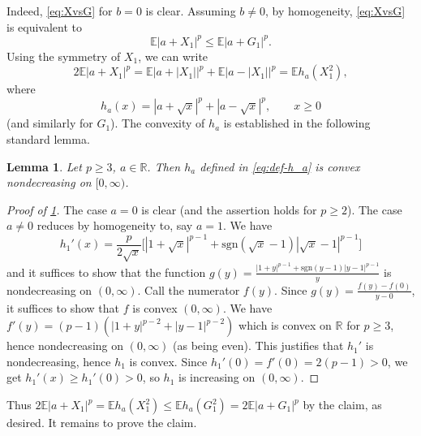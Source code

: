 \documentclass[10pt]{article}
\newcommand{\E}{\mathbb{E}}
\newcommand{\1}{\textbf{1}}
\newcommand{\R}{\mathbb{R}}
\newtheorem{lemma}{Lemma}[subsection]
\theoremstyle{remark}
\theoremstyle{definition}
\begin{document}
\noindent
Indeed, \eqref{eq:XvsG} for $b = 0$ is clear. Assuming $b \neq 0$, by homogeneity, \eqref{eq:XvsG} is equivalent to
\[
\E|a+X_1|^p \leq \E|a+G_1|^p.
\]
Using the symmetry of $X_1$, we can write
\[
2\E|a+X_1|^p = \E|a + |X_1||^p + \E|a-|X_1||^p = \E h_a(X_1^2),
\]
where
\begin{equation}\label{eq:def-h_a}
h_a(x) = |a + \sqrt{x}|^p + |a - \sqrt{x}|^p, \qquad x \geq 0
\end{equation}
(and similarly for $G_1$). The convexity of $h_a$ is established in the following standard lemma.

\begin{lemma}\label{lm:h_a-convex}
Let $p \geq 3$, $a \in \R$. Then $h_a$ defined in \eqref{eq:def-h_a} is convex nondecreasing on $[0,\infty)$.
\end{lemma}
\begin{proof}[Proof of \ref{lm:h_a-convex}]
The case $a = 0$ is clear (and the assertion holds for $p \geq 2$). The case $a \neq 0$ reduces by homogeneity to, say $a = 1$. We have
\[
h_1'(x) = \frac{p}{2\sqrt{x}}\Big[|1+\sqrt{x}|^{p-1}+\text{sgn}(\sqrt{x}-1)|\sqrt{x}-1|^{p-1}\Big]
\]
and it suffices to show that the function $g(y) = \frac{|1+y|^{p-1}+\text{sgn}(y-1)|y-1|^{p-1}}{y}$ is nondecreasing on $(0,\infty)$. Call the numerator $f(y)$. Since $g(y) = \frac{f(y) - f(0)}{y-0}$, it suffices to show that $f$ is convex $(0,\infty)$. We have $f'(y) = (p-1)(|1+y|^{p-2}+|y-1|^{p-2})$ which is convex on $\R$ for $p \geq 3$, hence nondecreasing on $(0,\infty)$ (as being even). This justifies that $h_1'$ is nondecreasing, hence $h_1$ is convex. Since $h_1'(0) = f'(0) = 2(p-1) > 0$, we get $h_1'(x) \geq h_1'(0) > 0$, so $h_1$ is increasing on $(0,\infty)$.
\end{proof}

Thus $2\E|a+X_1|^p = \E h_a(X_1^2) \leq \E h_a(G_1^2) = 2\E|a+G_1|^p$ by the claim, as desired. It remains to prove the claim.
\end{document}
